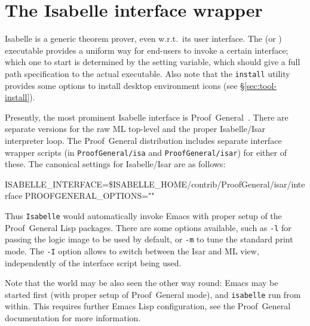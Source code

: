 \section{The Isabelle interface wrapper}\label{sec:interface}

Isabelle is a generic theorem prover, even w.r.t.\ its user interface.  The
 (or ) executable provides a
uniform way for end-users to invoke a certain interface; which one to start is
determined by the  setting variable, which should
give a full path specification to the actual executable.  Also note that the
\texttt{install} utility provides some options to install desktop environment
icons (see \S\ref{sec:tool-install}).

Presently, the most prominent Isabelle interface is
Proof~General~\cite{proofgeneral}.  There
are separate versions for the raw ML top-level and the proper Isabelle/Isar
interpreter loop.  The Proof~General distribution includes separate interface
wrapper scripts (in \texttt{ProofGeneral/isa} and \texttt{ProofGeneral/isar})
for either of these.  The canonical settings for Isabelle/Isar are as follows:
\begin{ttbox}
ISABELLE_INTERFACE=\$ISABELLE_HOME/contrib/ProofGeneral/isar/interface
PROOFGENERAL_OPTIONS=""
\end{ttbox}
Thus \texttt{Isabelle} would automatically invoke Emacs with proper setup of
the Proof~General Lisp packages.  There are some options available, such as
\texttt{-l} for passing the logic image to be used by default, or \texttt{-m}
to tune the standard print mode.  The \texttt{-I} option allows to switch
between the Isar and ML view, independently of the interface script being
used.
  
\medskip Note that the world may be also seen the other way round: Emacs may
be started first (with proper setup of Proof~General mode), and
\texttt{isabelle} run from within.  This requires further Emacs Lisp
configuration, see the Proof~General documentation \cite{proofgeneral} for
more information.

